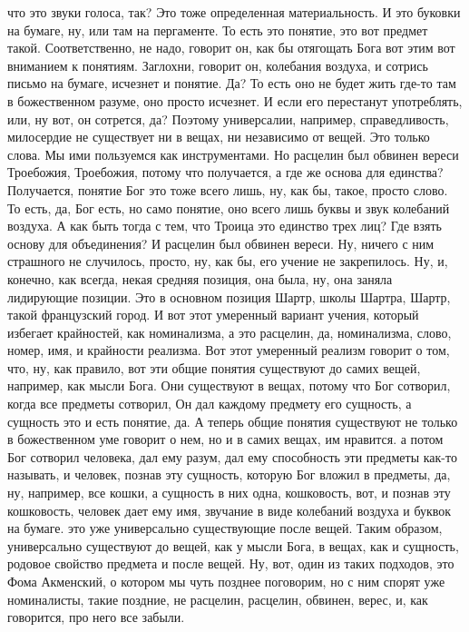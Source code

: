 что это звуки голоса, так? Это тоже определенная материальность. И это буковки
на бумаге, ну, или там на пергаменте. То есть это понятие, это вот предмет
такой. Соответственно, не надо, говорит он, как бы отягощать Бога вот этим вот
вниманием к понятиям. Заглохни, говорит он, колебания воздуха, и сотрись письмо
на бумаге, исчезнет и понятие. Да? То есть оно не будет жить где-то там в
божественном разуме, оно просто исчезнет. И если его перестанут употреблять,
или, ну вот, он сотрется, да? Поэтому универсалии, например, справедливость,
милосердие не существует ни в вещах, ни независимо от вещей. Это только слова.
Мы ими пользуемся как инструментами. Но расцелин был обвинен вереси Троебожия,
Троебожия, потому что получается, а где же основа для единства? Получается,
понятие Бог это тоже всего лишь, ну, как бы, такое, просто слово. То есть, да,
Бог есть, но само понятие, оно всего лишь буквы и звук колебаний воздуха. А как
быть тогда с тем, что Троица это единство трех лиц? Где взять основу для
объединения? И расцелин был обвинен вереси. Ну, ничего с ним страшного не
случилось, просто, ну, как бы, его учение не закрепилось. Ну, и, конечно, как
всегда, некая средняя позиция, она была, ну, она заняла лидирующие позиции. Это
в основном позиция Шартр, школы Шартра, Шартр, такой французский город. И вот
этот умеренный вариант учения, который избегает крайностей, как номинализма, а
это расцелин, да, номинализма, слово, номер, имя, и крайности реализма. Вот этот
умеренный реализм говорит о том, что, ну, как правило, вот эти общие понятия
существуют до самих вещей, например, как мысли Бога. Они существуют в вещах,
потому что Бог сотворил, когда все предметы сотворил, Он дал каждому предмету
его сущность, а сущность это и есть понятие, да. А теперь общие понятия
существуют не только в божественном уме говорит о нем, но и в самих вещах, им
нравится. а потом Бог сотворил человека, дал ему разум, дал ему способность эти
предметы как-то называть, и человек, познав эту сущность, которую Бог вложил в
предметы, да, ну, например, все кошки, а сущность в них одна, кошковость, вот, и
познав эту кошковость, человек дает ему имя, звучание в виде колебаний воздуха и
буквок на бумаге. это уже универсально существующие после вещей. Таким образом,
универсально существуют до вещей, как у мысли Бога, в вещах, как и сущность,
родовое свойство предмета и после вещей. Ну, вот, один из таких подходов, это
Фома Акменский, о котором мы чуть позднее поговорим, но с ним спорят уже
номиналисты, такие поздние, не расцелин, расцелин, обвинен, верес, и, как
говорится, про него все забыли. 

